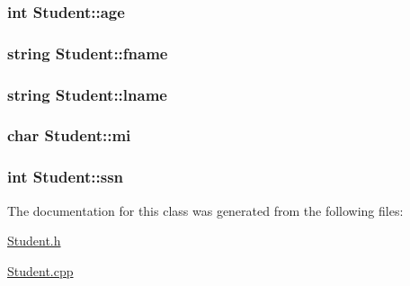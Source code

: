 \subsubsection[{\texorpdfstring{age}{age}}]{\setlength{\rightskip}{0pt plus 5cm}int Student\+::age\hspace{0.3cm}{\ttfamily [private]}}\hypertarget{classStudent_a552a431a43ffc545d180424597d51f97}{}\label{classStudent_a552a431a43ffc545d180424597d51f97}
\subsubsection[{\texorpdfstring{fname}{fname}}]{\setlength{\rightskip}{0pt plus 5cm}string Student\+::fname\hspace{0.3cm}{\ttfamily [private]}}\hypertarget{classStudent_a333c7d227c87fdfa821d0232e21f9006}{}\label{classStudent_a333c7d227c87fdfa821d0232e21f9006}
\subsubsection[{\texorpdfstring{lname}{lname}}]{\setlength{\rightskip}{0pt plus 5cm}string Student\+::lname\hspace{0.3cm}{\ttfamily [private]}}\hypertarget{classStudent_a6c934004d6a468a354916bcf0f998190}{}\label{classStudent_a6c934004d6a468a354916bcf0f998190}
\subsubsection[{\texorpdfstring{mi}{mi}}]{\setlength{\rightskip}{0pt plus 5cm}char Student\+::mi\hspace{0.3cm}{\ttfamily [private]}}\hypertarget{classStudent_afd8d4557f2ac6bb7681c32e691248328}{}\label{classStudent_afd8d4557f2ac6bb7681c32e691248328}
\subsubsection[{\texorpdfstring{ssn}{ssn}}]{\setlength{\rightskip}{0pt plus 5cm}int Student\+::ssn\hspace{0.3cm}{\ttfamily [private]}}\hypertarget{classStudent_aa7181a8aac86888176481f901bee2cbd}{}\label{classStudent_aa7181a8aac86888176481f901bee2cbd}


The documentation for this class was generated from the following files\+:\begin{DoxyCompactItemize}
\item 
\hyperlink{Student_8h}{Student.\+h}\item 
\hyperlink{Student_8cpp}{Student.\+cpp}\end{DoxyCompactItemize}
